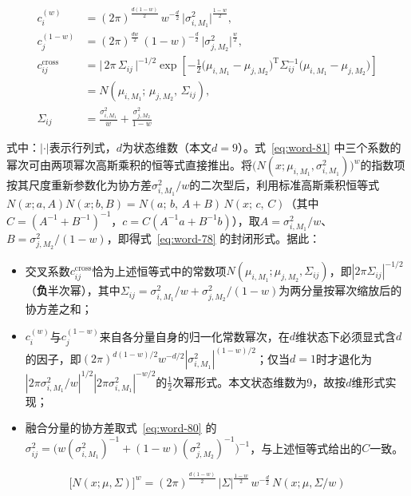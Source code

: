 \documentclass[UTF8,a4paper,zihao=-4]{ctexart}
\begin{document}
\begin{equation}
\begin{aligned}
c_{i}^{(w)}&=(2\pi)^{\frac{d(1-w)}{2}}\,w^{-\frac{d}{2}}\,\bigl|\sigma_{i,M_1}^{2}\bigr|^{\frac{1-w}{2}},\\
c_{j}^{(1-w)}&=(2\pi)^{\frac{dw}{2}}\,(1-w)^{-\frac{d}{2}}\,\bigl|\sigma_{j,M_2}^{2}\bigr|^{\frac{w}{2}},\\
c_{ij}^{\mathrm{cross}}&=\bigl|\,2\pi\,\Sigma_{ij}\,\bigr|^{-1/2}\exp\!\left[-\tfrac12\bigl(\mu_{i,M_1}-\mu_{j,M_2}\bigr)^{\mathrm T}\Sigma_{ij}^{-1}\bigl(\mu_{i,M_1}-\mu_{j,M_2}\bigr)\right]\\
&=N\!\left(\mu_{i,M_1};\,\mu_{j,M_2},\,\Sigma_{ij}\right),\\
\Sigma_{ij}&=\frac{\sigma_{i,M_1}^{2}}{w}+\frac{\sigma_{j,M_2}^{2}}{1-w}
\end{aligned}
\label{eq:word-81}
\end{equation}


式中：\(|\cdot|\)表示行列式，\(d\)为状态维数（本文\(d=9\)）。式~\eqref{eq:word-81} 中三个系数的幂次可由两项幂次高斯乘积的恒等式直接推出。将\(\bigl(N(x;\mu_{i,M_1},\sigma_{i,M_1}^{2})\bigr)^{w}\)的指数项按其尺度重新参数化为协方差\(\sigma_{i,M_1}^{2}/w\)的二次型后，利用标准高斯乘积恒等式\(N(x;a,A)N(x;b,B)=N(a;\,b,\,A+B)\,N(x;\,c,\,C)\)（其中\(C=(A^{-1}+B^{-1})^{-1}\)，\(c=C(A^{-1}a+B^{-1}b)\)），取\(A=\sigma_{i,M_1}^{2}/w\)、\(B=\sigma_{j,M_2}^{2}/(1-w)\)，即得式~\eqref{eq:word-78} 的封闭形式。据此：

\begin{itemize}
\item 交叉系数\(c_{ij}^{\mathrm{cross}}\)恰为上述恒等式中的常数项\(N(\mu_{i,M_1};\mu_{j,M_2},\Sigma_{ij})\)，即\(|2\pi\Sigma_{ij}|^{-1/2}\)（\textbf{负}半次幂），其中\(\Sigma_{ij}=\sigma_{i,M_1}^{2}/w+\sigma_{j,M_2}^{2}/(1-w)\)为两分量按幂次缩放后的协方差之和；
\item \(c_{i}^{(w)}\)与\(c_{j}^{(1-w)}\)来自各分量自身的归一化常数幂次，在\(d\)维状态下必须显式含\(d\)的因子，即\((2\pi)^{d(1-w)/2}w^{-d/2}|\sigma_{i,M_1}^{2}|^{(1-w)/2}\)；仅当\(d=1\)时才退化为\(|2\pi\sigma_{i,M_1}^{2}/w|^{1/2}|2\pi\sigma_{i,M_1}^{2}|^{-w/2}\)的\(\tfrac12\)次幂形式。本文状态维数为9，故按\(d\)维形式实现；
\item 融合分量的协方差取式~\eqref{eq:word-80} 的\(\sigma_{ij}^{2}=\bigl(w(\sigma_{i,M_1}^{2})^{-1}+(1-w)(\sigma_{j,M_2}^{2})^{-1}\bigr)^{-1}\)，与上述恒等式给出的\(C\)一致。
\end{itemize}

\begin{equation}
\bigl[N(x;\mu,\Sigma)\bigr]^{w}=(2\pi)^{\frac{d(1-w)}{2}}\,\lvert\Sigma\rvert^{\frac{1-w}{2}}\,w^{-\frac{d}{2}}\,N(x;\mu,\Sigma/w)
\label{eq:pow-identity}
\end{equation}
\end{document}
